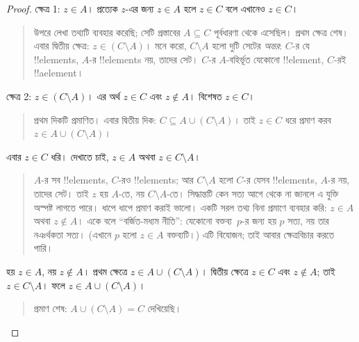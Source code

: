 \documentclass[../../../include/open-logic-section]{subfiles}
\begin{document}
\begin{proof}
  ক্ষেত্র 1: $z \in A$। প্রত্যেক $z$-এর জন্য
  $z \in A$ হলে $z \in C$ বলে এখানেও
  $z \in C$।
  \begin{quote}
    উপরে লেখা তথ্যটি ব্যবহার করেছি; সেটি প্রস্তাবের
    $A \subseteq C$ পূর্বধারণা থেকে এসেছিল।
    প্রথম ক্ষেত্র শেষ। এবার দ্বিতীয় ক্ষেত্র:
    $z \in (C \setminus A)$। মনে করো,
    $C \setminus A$ হলো দুটি সেটের \emph{অন্তর}:
    $C$-র যে !!{element}s, $A$-র !!{element}s
    নয়, তাদের সেট। $C$-র $A$-বহির্ভূত যেকোনো
    !!{element}, $C$-রই !!a{element}।
  \end{quote}
  ক্ষেত্র 2: $z \in (C \setminus A)$। এর অর্থ
  $z \in C$ এবং $z \notin A$। বিশেষত $z \in C$।
  \begin{quote}
    প্রথম দিকটি প্রমাণিত। এবার দ্বিতীয় দিক:
    $C \subseteq A \cup (C \setminus A)$।
    তাই $z \in C$ ধরে প্রমাণ করব
    $z \in A \cup (C \setminus A)$।
  \end{quote}
  এবার $z \in C$ ধরি। দেখাতে চাই, $z \in A$
  অথবা $z \in C \setminus A$।
  \begin{quote}
    $A$-র সব !!{element}s, $C$-রও
    !!{element}s; আর $C \setminus A$ হলো
    $C$-র যেসব !!{element}s, $A$-র নয়,
    তাদের সেট। তাই $z$ হয় $A$-তে, নয়
    $C \setminus A$-তে। সিদ্ধান্তটি কেন সত্য
    আগে থেকে না জানলে এ যুক্তি অস্পষ্ট লাগতে
    পারে। ধাপে ধাপে প্রমাণ করাই ভালো। একটি
    সরল তথ্য বিনা প্রমাণে ব্যবহার করি:
    $z \in A$ অথবা $z \notin A$। একে বলে
    ``বর্জিত-মধ্যম নীতি'': যেকোনো বক্তব্য~$p$-র
    জন্য হয় $p$ সত্য, নয় তার নঞর্থকতা সত্য।
    (এখানে $p$ হলো $z \in A$ বক্তব্যটি।)
    এটি বিযোজন; তাই আবার ক্ষেত্রবিচার করতে পারি।
  \end{quote}
  হয় $z \in A$, নয় $z \notin A$। প্রথম
  ক্ষেত্রে $z \in A \cup (C \setminus A)$।
  দ্বিতীয় ক্ষেত্রে $z \in C$ এবং $z \notin A$;
  তাই $z \in C \setminus A$। ফলে
  $z \in A \cup (C \setminus A)$।
  \begin{quote}
    প্রমাণ শেষ: $A \cup (C \setminus A) = C$
    দেখিয়েছি।
  \end{quote}
\end{proof}
\end{document}
